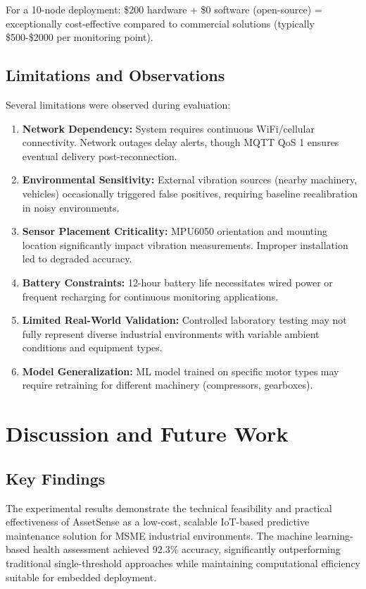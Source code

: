 \documentclass[conference]{IEEEtran}
\begin{document}
For a 10-node deployment: \$200 hardware + \$0 software (open-source) = exceptionally cost-effective compared to commercial solutions (typically \$500-\$2000 per monitoring point).

\subsection{Limitations and Observations}

Several limitations were observed during evaluation:

\begin{enumerate}
\item \textbf{Network Dependency:} System requires continuous WiFi/cellular connectivity. Network outages delay alerts, though MQTT QoS 1 ensures eventual delivery post-reconnection.
\item \textbf{Environmental Sensitivity:} External vibration sources (nearby machinery, vehicles) occasionally triggered false positives, requiring baseline recalibration in noisy environments.
\item \textbf{Sensor Placement Criticality:} MPU6050 orientation and mounting location significantly impact vibration measurements. Improper installation led to degraded accuracy.
\item \textbf{Battery Constraints:} 12-hour battery life necessitates wired power or frequent recharging for continuous monitoring applications.
\item \textbf{Limited Real-World Validation:} Controlled laboratory testing may not fully represent diverse industrial environments with variable ambient conditions and equipment types.
\item \textbf{Model Generalization:} ML model trained on specific motor types may require retraining for different machinery (compressors, gearboxes).
\end{enumerate}

\section{Discussion and Future Work}

\subsection{Key Findings}

The experimental results demonstrate the technical feasibility and practical effectiveness of AssetSense as a low-cost, scalable IoT-based predictive maintenance solution for MSME industrial environments. The machine learning-based health assessment achieved 92.3\% accuracy, significantly outperforming traditional single-threshold approaches while maintaining computational efficiency suitable for embedded deployment.
\end{document}
